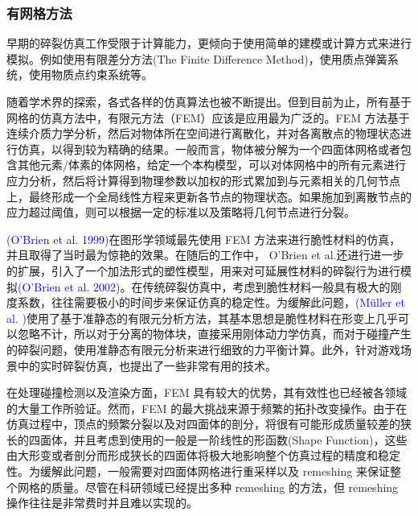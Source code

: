 \subsubsection{有网格方法}

早期的碎裂仿真工作受限于计算能力，更倾向于使用简单的建模或计算方式来进行模拟。例如使用有限差分方法(The Finite Difference Method)，使用质点弹簧系统，使用物质点约束系统等。

随着学术界的探索，各式各样的仿真算法也被不断提出。但到目前为止，所有基于网格的仿真方法中，有限元方法（FEM）应该是应用最为广泛的。FEM 方法基于连续介质力学分析，然后对物体所在空间进行离散化，并对各离散点的物理状态进行仿真，以得到较为精确的结果。一般而言，物体被分解为一个四面体网格或者包含其他元素/体素的体网格，给定一个本构模型，可以对体网格中的所有元素进行应力分析，然后将计算得到物理参数以加权的形式累加到与元素相关的几何节点上，最终形成一个全局线性方程来更新各节点的物理状态。如果施加到离散节点的应力超过阈值，则可以根据一定的标准以及策略将几何节点进行分裂。

\textcolor{blue}{(O'Brien et al. 1999)\parencite{OBrien1999}}在图形学领域最先使用 FEM 方法来进行脆性材料的仿真，并且取得了当时最为惊艳的效果。在随后的工作中， O'Brien et al.还进行进一步的扩展，引入了一个加法形式的塑性模型，用来对可延展性材料的碎裂行为进行模拟\textcolor{blue}{(O'Brien et al. 2002)\parencite{OBrien2002}}。在传统碎裂仿真中，考虑到脆性材料一般具有极大的刚度系数，往往需要极小的时间步来保证仿真的稳定性。为缓解此问题，\textcolor{blue}{(M\"{u}ller et al. )\parencite{Muller2001}}使用了基于准静态的有限元分析方法，其基本思想是脆性材料在形变上几乎可以忽略不计，所以对于分离的物体块，直接采用刚体动力学仿真，而对于碰撞产生的碎裂问题，使用准静态有限元分析来进行细致的力平衡计算。此外，针对游戏场景中的实时碎裂仿真，也提出了一些非常有用的技术。

在处理碰撞检测以及渲染方面，FEM 具有较大的优势，其有效性也已经被各领域的大量工作所验证。然而，FEM 的最大挑战来源于频繁的拓扑改变操作。由于在仿真过程中，顶点的频繁分裂以及对四面体的剖分，将很有可能形成质量较差的狭长的四面体，并且考虑到使用的一般是一阶线性的形函数(Shape Function)，这些由大形变或者剖分而形成狭长的四面体将极大地影响整个仿真过程的精度和稳定性。为缓解此问题，一般需要对四面体网格进行重采样以及 remeshing 来保证整个网格的质量。尽管在科研领域已经提出多种 remeshing 的方法，但 remeshing 操作往往是非常费时并且难以实现的。

